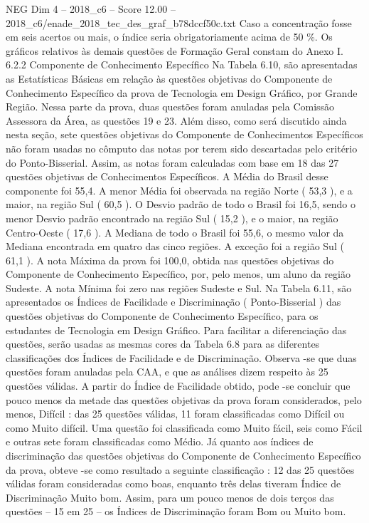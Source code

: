 \begin{textsample}{NEG Dim 4 – 2018\_c6 – Score 12.00 – 2018\_c6/enade\_2018\_tec\_des\_graf\_b78dccf50c.txt}
Caso a concentração fosse em seis acertos ou mais, o índice seria obrigatoriamente acima de 50 \%.
Os gráficos relativos às demais questões de Formação Geral constam do Anexo I. 6.2.2 Componente de Conhecimento Específico Na Tabela 6.10, são apresentadas as Estatísticas Básicas em relação às questões objetivas do Componente de Conhecimento Específico da prova de Tecnologia em Design Gráfico, por Grande Região.
Nessa parte da prova, duas questões foram anuladas pela Comissão Assessora da Área, as questões 19 e 23.
Além disso, como será discutido ainda nesta seção, sete questões objetivas do Componente de Conhecimentos Específicos não foram usadas no cômputo das notas por terem sido descartadas pelo critério do Ponto-Bisserial.
Assim, as notas foram calculadas com base em 18 das 27 questões objetivas de Conhecimentos Específicos.
A Média do Brasil desse componente foi 55,4.
A menor Média foi observada na região Norte ( 53,3 ), e a maior, na região Sul ( 60,5 ).
O Desvio padrão de todo o Brasil foi 16,5, sendo o menor Desvio padrão encontrado na região Sul ( 15,2 ), e o maior, na região Centro-Oeste ( 17,6 ).
A Mediana de todo o Brasil foi 55,6, o mesmo valor da Mediana encontrada em quatro das cinco regiões.
A exceção foi a região Sul ( 61,1 ).
A nota Máxima da prova foi 100,0, obtida nas questões objetivas do Componente de Conhecimento Específico, por, pelo menos, um aluno da região Sudeste.
A nota Mínima foi zero nas regiões Sudeste e Sul.
Na Tabela 6.11, são apresentados os Índices de Facilidade e Discriminação ( Ponto-Bisserial ) das questões objetivas do Componente de Conhecimento Específico, para os estudantes de Tecnologia em Design Gráfico.
Para facilitar a diferenciação das questões, serão usadas as mesmas cores da Tabela 6.8 para as diferentes classificações dos Índices de Facilidade e de Discriminação.
Observa -se que duas questões foram anuladas pela CAA, e que as análises dizem respeito às 25 questões válidas.
A partir do Índice de Facilidade obtido, pode -se concluir que pouco menos da metade das questões objetivas da prova foram considerados, pelo menos, Difícil : das 25 questões válidas, 11 foram classificadas como Difícil ou como Muito difícil.
Uma questão foi classificada como Muito fácil, seis como Fácil e outras sete foram classificadas como Médio.
Já quanto aos índices de discriminação das questões objetivas do Componente de Conhecimento Específico da prova, obteve -se como resultado a seguinte classificação : 12 das 25 questões válidas foram consideradas como boas, enquanto três delas tiveram Índice de Discriminação Muito bom.
Assim, para um pouco menos de dois terços das questões – 15 em 25 – os Índices de Discriminação foram Bom ou Muito bom.

\end{textsample}
